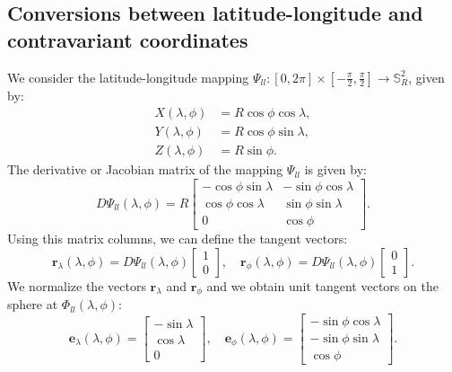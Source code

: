 \subsection{Conversions between latitude-longitude and contravariant coordinates}
\label{anexo-sph-ll}
We consider the latitude-longitude mapping 
$\Psi_{ll}: [0,2\pi] \times [-\frac{\pi}{2},\frac{\pi}{2}] \to \mathbb{S}^2_R$, given by:
\begin{align}
	\label{ll2sph}
	X(\lambda,\phi) &= R\cos \phi \cos \lambda,\\
	Y(\lambda,\phi) &= R\cos \phi \sin \lambda,\\
	Z(\lambda,\phi) &= R\sin \phi.
\end{align}
The derivative or Jacobian matrix of the mapping $\Psi_{ll}$ is given by:
\begin{equation}
	\label{dpsi}
	D\Psi_{ll} (\lambda,\phi) = 
	R \begin{bmatrix}
		-\cos \phi \sin \lambda &  -\sin \phi \cos \lambda \\
		\cos \phi \cos \lambda & \sin \phi \sin \lambda \\
		0  &  \cos \phi
	\end{bmatrix}.
\end{equation}
Using this matrix columns, we can define the tangent vectors:
\begin{equation}
	\boldsymbol{r}_{\lambda}(\lambda,\phi) = D\Psi_{ll}(\lambda,\phi)
	\begin{bmatrix}
		1 \\
		0
	\end{bmatrix}, \quad
	\boldsymbol{r}_{\phi}(\lambda,\phi) = D\Psi_{ll}(\lambda,\phi)
	\begin{bmatrix}
		0 \\
		1
	\end{bmatrix}.
\end{equation}
We normalize the vectors $\boldsymbol{r}_\lambda$ and $\boldsymbol{r}_\phi$
and we obtain unit tangent vectors on the sphere at $\Phi_{ll}(\lambda, \phi)$:
\begin{equation}
	\label{latlon_tg_vectors}
	\boldsymbol{e}_{\lambda}(\lambda,\phi) = 
	\begin{bmatrix}
		-\sin \lambda \\
		\cos \lambda \\
		0
	\end{bmatrix}, \quad
	\boldsymbol{e}_{\phi}(\lambda,\phi) =
	\begin{bmatrix}
		-\sin \phi \cos \lambda \\
		-\sin \phi \sin \lambda \\
		\cos \phi
	\end{bmatrix}.
\end{equation}
